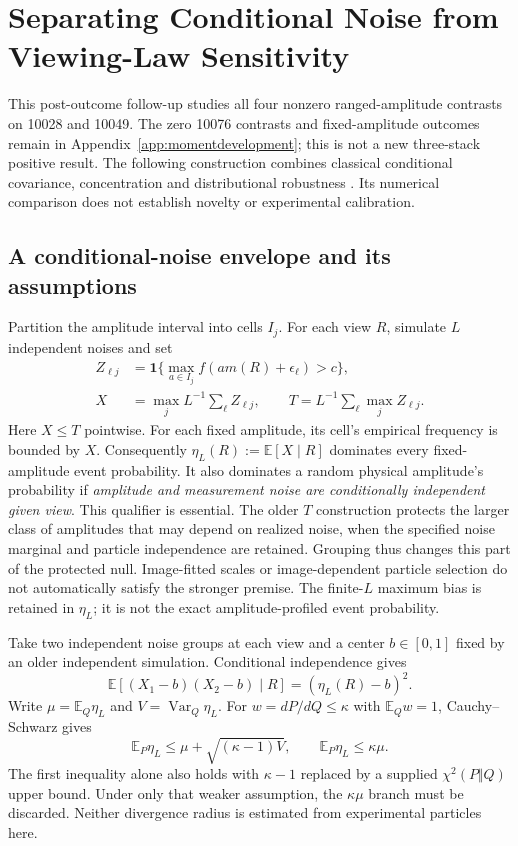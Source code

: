 \section{Separating Conditional Noise from Viewing-Law Sensitivity}
\label{app:viewvariance}
This post-outcome follow-up studies all four nonzero ranged-amplitude contrasts
on 10028 and 10049. The zero 10076 contrasts and fixed-amplitude outcomes remain
in Appendix~\ref{app:momentdevelopment}; this is not a new three-stack positive
result. The following construction combines classical conditional covariance,
concentration and distributional robustness
\citep{janon2014sobol,maurer2009bernstein,duchi2019variance}. Its numerical
comparison does not establish novelty or experimental calibration.

\subsection{A conditional-noise envelope and its assumptions}
Partition the amplitude interval into cells $I_j$. For each view $R$, simulate
$L$ independent noises and set
\begin{align*}
 Z_{\ell j}&=\mathbf1\{\max_{a\in I_j}f(a m(R)+\epsilon_\ell)>c\},\\
 X&=\max_j L^{-1}\textstyle\sum_\ell Z_{\ell j},\qquad
 T=L^{-1}\textstyle\sum_\ell\max_j Z_{\ell j}.
\end{align*}
Here $X\le T$ pointwise. For each fixed amplitude, its cell's empirical
frequency is bounded by $X$. Consequently
$\eta_L(R):=\mathbb E[X\mid R]$ dominates every fixed-amplitude event
probability. It also dominates a random physical amplitude's probability if
\emph{amplitude and measurement noise are conditionally independent given
view}. This qualifier is essential. The older $T$ construction protects the
larger class of amplitudes that may depend on realized noise, when the specified
noise marginal and particle independence are retained. Grouping thus changes
this part of the protected null. Image-fitted scales or image-dependent particle
selection do not automatically satisfy the stronger premise. The finite-$L$
maximum bias is retained in $\eta_L$; it is not the exact amplitude-profiled
event probability.

Take two independent noise groups at each view and a center $b\in[0,1]$ fixed
by an older independent simulation. Conditional independence gives
\[
 \mathbb E[(X_1-b)(X_2-b)\mid R]=(\eta_L(R)-b)^2.
\]
Write $\mu=\mathbb E_Q\eta_L$ and $V=\operatorname{Var}_Q\eta_L$.
For $w=dP/dQ\le\kappa$ with $\mathbb E_Qw=1$, Cauchy--Schwarz gives
\[
 \mathbb E_P\eta_L\le\mu+\sqrt{(\kappa-1)V},
 \qquad \mathbb E_P\eta_L\le\kappa\mu.
\]
The first inequality alone also holds with $\kappa-1$ replaced by a supplied
$\chi^2(P\Vert Q)$ upper bound. Under only that weaker assumption, the
$\kappa\mu$ branch must be discarded. Neither divergence radius is estimated
from experimental particles here.

